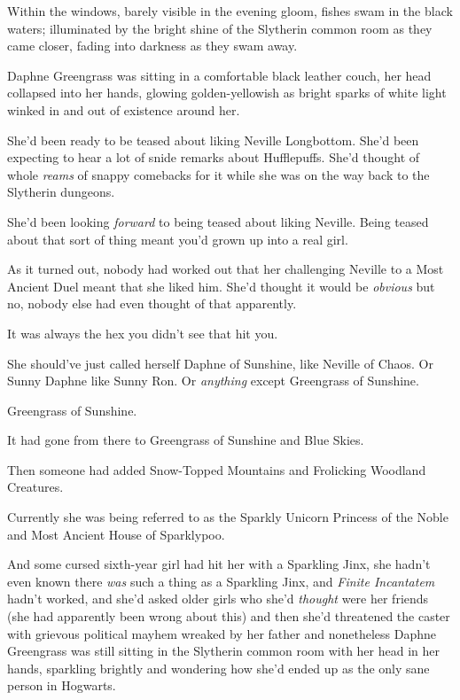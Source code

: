 Within the windows, barely visible in the evening gloom, fishes swam in the black waters; illuminated by the bright shine of the Slytherin common room as they came closer, fading into darkness as they swam away.

Daphne Greengrass was sitting in a comfortable black leather couch, her head collapsed into her hands, glowing golden-yellowish as bright sparks of white light winked in and out of existence around her.

She’d been ready to be teased about liking Neville Longbottom. She’d been expecting to hear a lot of snide remarks about Hufflepuffs. She’d thought of whole \emph{reams} of snappy comebacks for it while she was on the way back to the Slytherin dungeons.

She’d been looking \emph{forward} to being teased about liking Neville. Being teased about that sort of thing meant you’d grown up into a real girl.

As it turned out, nobody had worked out that her challenging Neville to a Most Ancient Duel meant that she liked him. She’d thought it would be \emph{obvious} but no, nobody else had even thought of that apparently.

It was always the hex you didn’t see that hit you.

She should’ve just called herself Daphne of Sunshine, like Neville of Chaos. Or Sunny Daphne like Sunny Ron. Or \emph{anything} except Greengrass of Sunshine.

Greengrass of Sunshine.

It had gone from there to Greengrass of Sunshine and Blue Skies.

Then someone had added Snow-Topped Mountains and Frolicking Woodland Creatures.

Currently she was being referred to as the Sparkly Unicorn Princess of the Noble and Most Ancient House of Sparklypoo.

And some cursed sixth-year girl had hit her with a Sparkling Jinx, she hadn’t even known there \emph{was} such a thing as a Sparkling Jinx, and \emph{Finite Incantatem} hadn’t worked, and she’d asked older girls who she’d \emph{thought} were her friends (she had apparently been wrong about this) and then she’d threatened the caster with grievous political mayhem wreaked by her father and nonetheless Daphne Greengrass was still sitting in the Slytherin common room with her head in her hands, sparkling brightly and wondering how she’d ended up as the only sane person in Hogwarts.

